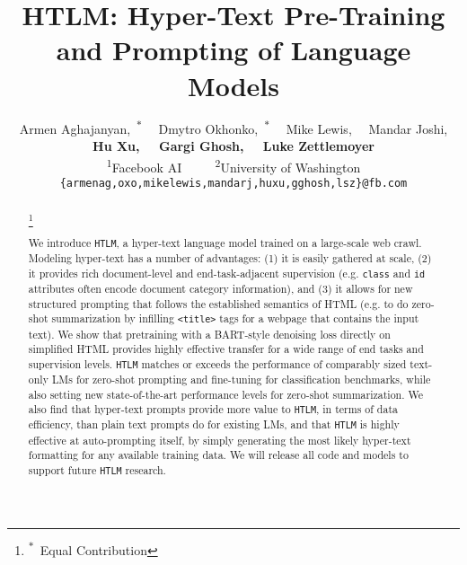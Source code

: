 \documentclass[11pt,a4paper]{article}
\title{HTLM: Hyper-Text Pre-Training and Prompting of Language Models}
\author{Armen Aghajanyan\affilsup{1},~\textsuperscript{$*$} ~~Dmytro Okhonko\affilsup{1},~\textsuperscript{$*$} 
~~Mike Lewis\affilsup{1}, ~~Mandar Joshi\affilsup{1,2}, \\
\textbf{Hu Xu\affilsup{1}, ~~Gargi Ghosh\affilsup{1}, ~~Luke Zettlemoyer\affilsup{1,2}} \\
\textsuperscript{1}Facebook AI ~~~~
\textsuperscript{2}University of Washington \\
  \texttt{\{armenag,oxo,mikelewis,mandarj,huxu,gghosh,lsz\}@fb.com} 
  }
\date{}
\newcommand{\HTLM}{\texttt{HTLM}}
\newcommand\blfootnote[1]{\begingroup
  \renewcommand\thefootnote{}\footnote{#1}\addtocounter{footnote}{-1}\endgroup
}
\begin{document}
\maketitle
\begin{abstract}
\blfootnote{\textsuperscript{$*$}~Equal Contribution}






We introduce \HTLM{}, a hyper-text language model trained on a large-scale web crawl. 
Modeling hyper-text has a number of advantages: (1) it is easily gathered at scale, (2) it provides rich document-level and end-task-adjacent supervision (e.g. \verb+class+ and \verb+id+ attributes often encode document category information), and (3) it allows for new structured prompting that follows the established semantics of HTML (e.g. to do zero-shot summarization by infilling \verb+<title>+ tags for a webpage that contains the input text). 
We show that pretraining with a BART-style denoising loss directly on simplified HTML provides highly effective transfer for a wide range of end tasks and supervision levels. 
\HTLM{} matches or exceeds the performance of comparably sized text-only LMs for zero-shot prompting and fine-tuning for classification benchmarks, while also setting new state-of-the-art performance levels for zero-shot summarization. 
We also find that hyper-text prompts provide more value to \HTLM{}, in terms of data efficiency, than plain text prompts do for existing LMs, and that \HTLM{} is highly effective at auto-prompting itself, by simply generating the most likely hyper-text formatting for any available training data.
We will release all code and models to support future \HTLM{} research. 
\end{abstract}
\end{document}
